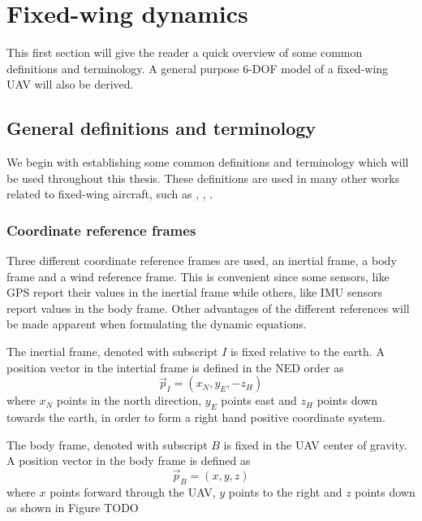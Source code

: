 \section{Fixed-wing dynamics}
This first section will give the reader a quick overview of some common definitions and terminology. 
A general purpose 6-DOF model of a fixed-wing UAV will also be derived. 
\subsection{General definitions and terminology}
We begin with establishing some common definitions and
 terminology which will be used throughout this thesis. These definitions are 
 used in many other works related to fixed-wing aircraft, such as \cite{uav_dynamics_wind}, \cite{uav_dynamics_modeling}, 
\cite{fighter_aircraft_mpc}. 

\subsubsection{Coordinate reference frames}
Three different coordinate reference frames are used, an inertial frame, a body frame and a wind reference frame.
This is convenient since some sensors, like GPS report their values in the inertial frame
 while others, like IMU sensors report values in the body frame. Other advantages of the different references
will be made apparent when formulating the dynamic equations.

\begin{definition}
    The inertial frame, denoted with subscript $I$ is fixed relative to the earth.
    A position vector in the intertial frame is defined in the NED order as
    \begin{equation}
        \vec{p}_I = (x_N, y_E, -z_H)
    \end{equation}
    where $x_N$ points in the north direction, $y_E$ points east and $z_H$ points down towards the earth,
    in order to form a right hand positive coordinate system.
\end{definition}

\begin{definition}
    The body frame, denoted with subscript $B$ is fixed in the UAV center of gravity.
    A position vector in the body frame is defined as
    \begin{equation}
        \vec{p}_B = (x, y, z)
    \end{equation}
    where $x$ points forward through the UAV, $y$ points to the right and $z$ points down as shown in Figure TODO
\end{definition}

